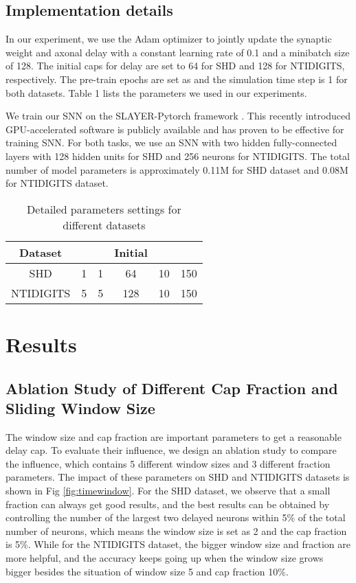 \documentclass{article}
\begin{document}
\subsection{Implementation details} 
In our experiment, we use the Adam optimizer to jointly update the synaptic weight and axonal delay with a constant learning rate of 0.1 and a minibatch size of 128. The initial caps for delay are set to 64 for SHD and 128 for NTIDIGITS, respectively. The pre-train epochs  are set as  and the simulation time step is 1   for both datasets. Table 1 lists  the parameters we used in our experiments.

We train our SNN on the SLAYER-Pytorch framework \cite{Shrestha2018}. This recently introduced GPU-accelerated software is publicly available and has proven to be effective for training SNN. For both tasks, we use an SNN with two hidden fully-connected layers with 128 hidden units for SHD and 256 neurons for NTIDIGITS. The total number of model parameters is approximately 0.11M for SHD dataset and 0.08M for NTIDIGITS dataset.\\

\vspace{-0.5cm}
\begin{table}[ht]
\small
	\centering
	\caption{
Detailed parameters settings for different datasets}
	\label{tbl:param}
	\begin{tabular}{clrccc}
		\cline{1-6}
		\multicolumn{1}{c}{\bf Dataset}& \multicolumn{1}{c}{\bf } & \multicolumn{1}{c}{\bf } & \textbf{Initial }  &\textbf{}&
		\\ \hline
	\multirow{1}{*}{{SHD}}
		& 1 	& 1  & 64&10&150 \\
\multirow{1}{*}{{NTIDIGITS}}
		&  5		& 5 & 128&10&150 \\
		\hline
	\end{tabular}
	\vspace{-0.5cm}
\end{table}\textbf{}

\section{Results}\label{4}
\subsection{Ablation Study of Different Cap Fraction and Sliding Window Size}
The window size and cap fraction are important parameters to get a reasonable delay cap. To evaluate their influence, we design an ablation study to compare the influence, which contains 5 different window sizes and 3 different fraction parameters. The impact of these parameters on SHD and NTIDIGITS datasets is shown in Fig \ref{fig:timewindow}. For the SHD dataset, we observe that a small fraction can always get good results, and 
the best results can be obtained by controlling the number of the largest two delayed neurons within 5\% of the total number of neurons, which means the window size is set as 2 and the cap fraction is 5\%.  While for the NTIDIGITS dataset, the bigger window size and fraction are more helpful, and the accuracy keeps going up when the window size grows bigger besides the situation of window size 5 and cap fraction 10\%. 
\end{document}
